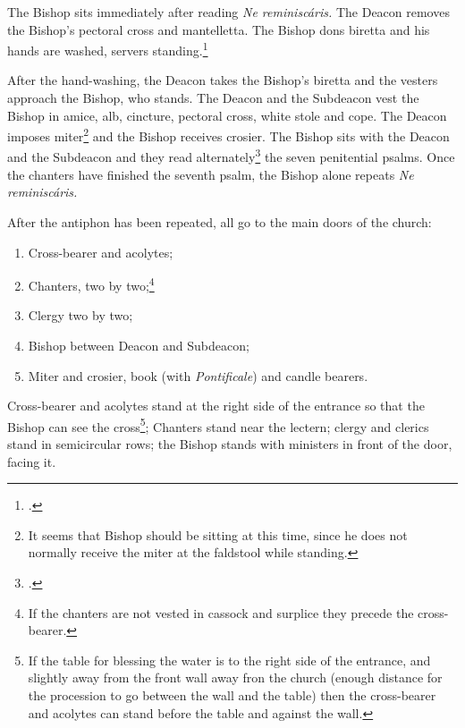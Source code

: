 \documentclass[letterpaper]{report}
\begin{document}
{    \rubric The Bishop sits immediately after reading \textit{Ne
    reminisc\'aris.} The Deacon removes the Bishop's pectoral cross and
    mantelletta. The Bishop dons biretta and his hands are washed, servers
    standing.\footcite[See][note 1, p. 39.]{consecranda}

    \rubric After the hand-washing, the Deacon takes the Bishop's biretta and
    the vesters approach the Bishop, who stands. The Deacon and the Subdeacon
    vest the Bishop in amice, alb, cincture, pectoral cross, white stole and
    cope. The Deacon imposes miter\footnote{It seems that Bishop should be
    sitting at this time, since he does not normally receive the miter at the
    faldstool while standing.} and the Bishop receives crosier. The Bishop sits
    with the Deacon and the Subdeacon and they read alternately\footcite[The
    bishop usually reads the first verse of each psalm and recites the verse
    \textit{Gl\'oria Patri.}][note 3, p. 39.]{consecranda} the seven penitential
    psalms. Once the chanters have finished the seventh psalm, the Bishop alone
    repeats \textit{Ne reminisc\'aris.}

    \rubric After the antiphon has been repeated, all go to the main doors of the
    church:

    \begin{enumerate}

        \item Cross-bearer and acolytes;

        \item Chanters, two by two;\footnote{If the chanters are not vested in
            cassock and surplice they precede the cross-bearer.}

        \item Clergy two by two;

        \item Bishop between Deacon and Subdeacon;

        \item Miter and crosier, book (with \textit{Pontificale}) and candle
            bearers.

    \end{enumerate}

    Cross-bearer and acolytes stand at the right side of the entrance so that
    the Bishop can see the cross\footnote{If the table for blessing the water
    is to the right side of the entrance, and slightly away from the front wall
    away fron the church (enough distance for the procession to go between the
    wall and the table) then the cross-bearer and acolytes can stand before the
    table and against the wall.}; Chanters stand near the lectern; clergy and
    clerics stand in semicircular rows; the Bishop stands with ministers in
    front of the door, facing it.

}
\end{document}
